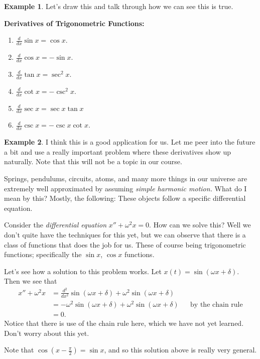 \documentclass[leqno]{article}
\theoremstyle{definition}
\newtheorem{example}{Example}[section]
\theoremstyle{remark}
\theoremstyle{theorem}
\begin{document}
\begin{example}
Let's draw this and talk through how we can see this is true. 
\vspace*{6cm}\\
\end{example}

\noindent \textbf{Derivatives of Trigonometric Functions:} 
\begin{enumerate}[1.]
\item $\frac{d}{dx} \sin x = \cos x$.
\item $\frac{d}{dx} \cos x = -\sin x$.
\item $\frac{d}{dx} \tan x = \sec^2 x$.
\item $\frac{d}{dx} \cot x = -\csc^2 x$.
\item $\frac{d}{dx} \sec x = \sec x \tan x$
\item $\frac{d}{dx} \csc x = -\csc x \cot x$.
\end{enumerate}

\begin{example}
I think this is a good application for us.  Let me peer into the future a bit and use a really important problem where these derivatives show up naturally.  Note that this will not be a topic in our course.

Springs, pendulums, circuits, atoms, and many more things in our universe are extremely well approximated by assuming \emph{simple harmonic motion.}  What do I mean by this? Mostly, the following: These objects follow a specific differential equation.

Consider the \emph{differential equation} $x''+\omega^2 x=0$.  How can we solve this?  Well we don't quite have the techniques for this yet, but we can observe that there is a class of functions that does the job for us. These of course being trigonometric functions; specifically the $\sin x$, $\cos x$ functions.

Let's see how a solution to this problem works.  Let $x(t)=\sin(\omega x + \delta)$. Then we see that
\begin{align*}
x''+\omega^2 x &= \frac{d^2}{dx^2} \sin(\omega x + \delta) +\omega^2 \sin(\omega x + \delta)\\
&= -\omega^2 \sin(\omega x + \delta) +\omega^2 \sin(\omega x + \delta) &&\textrm{by the chain rule}\\
&= 0.
\end{align*}
Notice that there is use of the chain rule here, which we have not yet learned.  Don't worry about this yet.

Note that $\cos\left( x-\frac{\pi}{2} \right)=\sin x$, and so this solution above is really very general.
\end{example}
\end{document}
